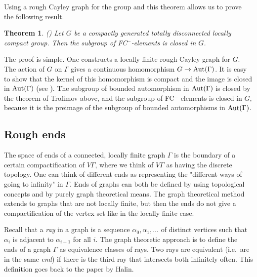 \documentclass{emsprocart}
\newtheorem{theorem}{Theorem}[section]
\theoremstyle{definition}
\begin{document}
Using a rough Cayley graph for the group and this theorem allows us
to prove the following result.

\begin{theorem}{\rm (\cite[Theorem~2]{Moller2003})}  Let $G$ be a
  compactly generated totally disconnected locally compact group.
  Then the subgroup of FC$^-$-elements is closed in $G$.
\end{theorem}

The proof is simple.  One constructs a locally finite rough Cayley
graph for $G$.  The action of $G$ on $\Gamma$ gives a continuous
homomorphism $G\rightarrow{\mbox{${\rm Aut}(\Gamma)$}}$.  It is easy to show that the kernel
of this homomorphism is compact and the image is closed in ${\mbox{${\rm Aut}(\Gamma)$}}$ (see
\cite[Corollary~1]{Moller2003}).  The subgroup of bounded automorphism
in ${\mbox{${\rm Aut}(\Gamma)$}}$ is
closed by the theorem of Trofimov above,
and the subgroup of FC$^-$-elements is closed in $G$, because it
is the preimage of the subgroup of bounded automorphisms in
${\mbox{${\rm Aut}(\Gamma)$}}$.

\subsection{Rough ends}
The space of ends of a connected, locally finite graph $\Gamma$ is the 
boundary of a certain compactification of $V\Gamma$, where we think of
$V\Gamma$ as having the discrete topology. One can 
think of different ends as representing the "different ways of 
going to infinity" in $\Gamma$.  Ends of graphs can both be defined by
using topological concepts and by purely graph theoretical means.
The graph theoretical method extends to graphs that are not locally
finite, but then the ends do not give a compactification of the vertex
set like in the locally finite case.

Recall that a {\em ray} in a graph is a sequence $\alpha_0, \alpha_1,
\ldots$ of
distinct vertices such that $\alpha_i$ is adjacent to $\alpha_{i+1}$
for all $i$.
The graph theoretic approach is to define the
ends of a graph $\Gamma$ as equivalence classes
of rays.  Two rays are equivalent
(i.e.~are in the same {\em end}) if
there is the third ray that intersects both infinitely often.  This
definition goes back to the paper \cite{Halin1964} by Halin.
\end{document}
